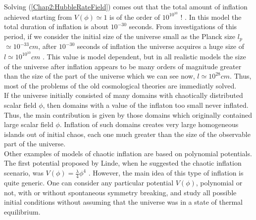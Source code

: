 \documentclass[11pt,a4paper,twoside]{book}
\begin{document}
 Solving (\ref{Chap2:HubbleRateField}) comes out that the total amount of inflation achieved starting from $ V(\phi) \simeq 1 $ is of the order of $ 10^{10^{10}} $ ! . In this model the total duration of inflation is about $ 10^{-30} $ seconds. From investigations of this period, if we consider the initial size of the universe small as the Planck size $ l_{p} $ $\simeq 10^{-33} cm$, after $ 10^{-30} $ seconds of inflation the universe acquires a huge size of $ l \simeq 10^{10^{10}} cm $ \cite{Chap2:Linde_HystoryInflation}. This value is model dependent, but in all realistic models  the size of the universe after inflation appears to be many orders of magnitude greater than the size of the part of the universe which we can see now, $ l \simeq 10^{28} cm $. Thus, most of the problems of the old cosmological theories are immediatly solved. \\
 If the universe initially consisted of many domains with chaotically distributed scalar field $\phi$, then domains with a value of the inflaton too small never inflated. Thus, the main contribution is given by those domains which originally contained large scalar field $\phi$. Inflation of such domains creates very large homogeneous islands out of initial chaos, each one much greater than the size of the observable part of the universe.\\
 Other examples of models of chaotic inflation are based on polynomial potentials. The first potential proposed by Linde, when he suggested the chaotic inflation scenario, was $ V(\phi) = \frac{\lambda}{4} \phi^{4} $ \cite{ChaoticInflationLinde:Chap2}. However, the main idea of this type of inflation is quite generic. One can consider any particular potential $ V(\phi) $, polynomial or not, with or without spontaneous symmetry breaking, and study all possible initial conditions without assuming that the universe was in a state of thermal equilibrium. 
 
\end{document}
